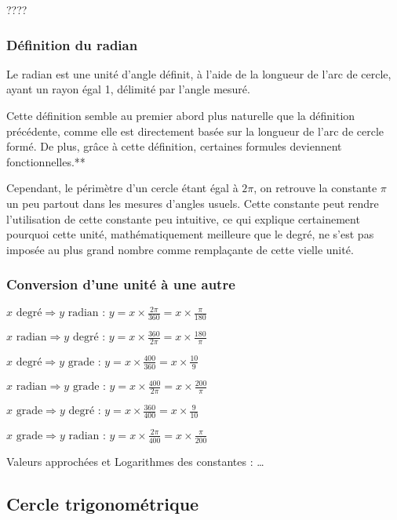 \documentclass[a4paper]{article}
\begin{document}
				????

			\subsubsection{Définition du radian}

				Le radian est une unité d'angle définit, à l'aide de la longueur de l'arc de cercle, ayant un rayon égal 1, délimité par l'angle mesuré.

				Cette définition semble au premier abord plus naturelle que la définition précédente, comme elle est directement basée sur la longueur de l'arc de cercle formé. De plus, grâce à cette définition, certaines formules deviennent fonctionnelles.**

				Cependant, le périmètre d'un cercle étant égal à $2 \pi$, on retrouve la constante $\pi$ un peu partout dans les mesures d'angles usuels. Cette constante peut rendre l'utilisation de cette constante peu intuitive, ce qui explique certainement pourquoi cette unité, mathématiquement meilleure que le degré, ne s'est pas imposée au plus grand nombre comme remplaçante de cette vielle unité.

			\subsubsection{Conversion d'une unité à une autre}

				$x \text{ degré} \Rightarrow y \text{ radian : }	y = x \times \frac{2 \pi}{360} = x \times \frac{\pi}{180}$

				$x \text{ radian} \Rightarrow y \text{ degré : }	y = x \times \frac{360}{2 \pi} = x \times \frac{180}{\pi}$

				$x \text{ degré} \Rightarrow y \text{ grade : }	y = x \times \frac{400}{360} = x \times \frac{10}{9}$

				$x \text{ radian} \Rightarrow y \text{ grade : }	y = x \times \frac{400}{2 \pi} = x \times \frac{200}{\pi}$

				$x \text{ grade} \Rightarrow y \text{ degré : }	y = x \times \frac{360}{400} = x \times \frac{9}{10}$

				$x \text{ grade} \Rightarrow y \text{ radian : }	y = x \times \frac{2 \pi}{400} = x \times \frac{\pi}{200}$

				Valeurs approchées et Logarithmes des constantes : …

		\subsection{Cercle trigonométrique}
\end{document}

